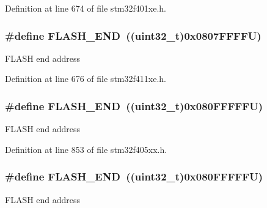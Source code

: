Definition at line 674 of file stm32f401xe.\+h.

\subsubsection[{\texorpdfstring{F\+L\+A\+S\+H\+\_\+\+E\+ND}{FLASH_END}}]{\setlength{\rightskip}{0pt plus 5cm}\#define F\+L\+A\+S\+H\+\_\+\+E\+ND~((uint32\+\_\+t)0x0807\+F\+F\+F\+F\+U)}\hypertarget{group___peripheral__registers__structures_ga8be554f354e5aa65370f6db63d4f3ee4}{}\label{group___peripheral__registers__structures_ga8be554f354e5aa65370f6db63d4f3ee4}
F\+L\+A\+SH end address 

Definition at line 676 of file stm32f411xe.\+h.

\subsubsection[{\texorpdfstring{F\+L\+A\+S\+H\+\_\+\+E\+ND}{FLASH_END}}]{\setlength{\rightskip}{0pt plus 5cm}\#define F\+L\+A\+S\+H\+\_\+\+E\+ND~((uint32\+\_\+t)0x080\+F\+F\+F\+F\+F\+U)}\hypertarget{group___peripheral__registers__structures_ga8be554f354e5aa65370f6db63d4f3ee4}{}\label{group___peripheral__registers__structures_ga8be554f354e5aa65370f6db63d4f3ee4}
F\+L\+A\+SH end address 

Definition at line 853 of file stm32f405xx.\+h.

\subsubsection[{\texorpdfstring{F\+L\+A\+S\+H\+\_\+\+E\+ND}{FLASH_END}}]{\setlength{\rightskip}{0pt plus 5cm}\#define F\+L\+A\+S\+H\+\_\+\+E\+ND~((uint32\+\_\+t)0x080\+F\+F\+F\+F\+F\+U)}\hypertarget{group___peripheral__registers__structures_ga8be554f354e5aa65370f6db63d4f3ee4}{}\label{group___peripheral__registers__structures_ga8be554f354e5aa65370f6db63d4f3ee4}
F\+L\+A\+SH end address 

